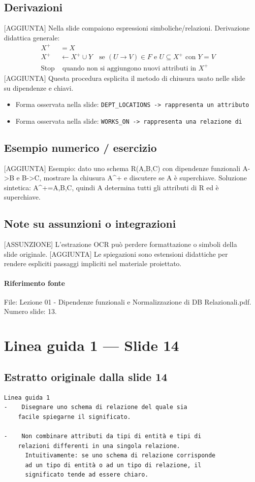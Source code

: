 \documentclass[11pt]{article}
\begin{document}
\subsection*{Derivazioni}
[AGGIUNTA] Nella slide compaiono espressioni simboliche/relazioni. Derivazione didattica generale:
\begin{align*}
X^+ &= X \\
X^+ &\leftarrow X^+ \cup Y \quad \text{se } (U \to V) \in F \text{ e } U \subseteq X^+ \text{ con } Y=V \\
\text{Stop} &\text{ quando non si aggiungono nuovi attributi in } X^+
\end{align*}
[AGGIUNTA] Questa procedura esplicita il metodo di chiusura usato nelle slide su dipendenze e chiavi.
\begin{itemize}[leftmargin=*]
\item Forma osservata nella slide: \texttt{DEPT\_LOCATIONS -> rappresenta un attributo}
\item Forma osservata nella slide: \texttt{WORKS\_ON -> rappresenta una relazione di}
\end{itemize}
\subsection*{Esempio numerico / esercizio}
[AGGIUNTA] Esempio: dato uno schema R(A,B,C) con dipendenze funzionali A->B e B->C, mostrare la chiusura A^+ e discutere se A è superchiave. Soluzione sintetica: A^+={A,B,C}, quindi A determina tutti gli attributi di R ed è superchiave.
\subsection*{Note su assunzioni o integrazioni}
[ASSUNZIONE] L'estrazione OCR può perdere formattazione o simboli della slide originale.
[AGGIUNTA] Le spiegazioni sono estensioni didattiche per rendere espliciti passaggi impliciti nel materiale proiettato.
\paragraph{Riferimento fonte} File: Lezione 01 - Dipendenze funzionali e Normalizzazione di DB Relazionali.pdf. Numero slide: 13.
\section{Linea guida 1 --- Slide 14}
\subsection*{Estratto originale dalla slide 14}
\begin{lstlisting}
Linea guida 1
-    Disegnare uno schema di relazione del quale sia
    facile spiegarne il significato.

-    Non combinare attributi da tipi di entità e tipi di
    relazioni differenti in una singola relazione.
      Intuitivamente: se uno schema di relazione corrisponde
      ad un tipo di entità o ad un tipo di relazione, il
      significato tende ad essere chiaro.
\end{lstlisting}
\end{document}
